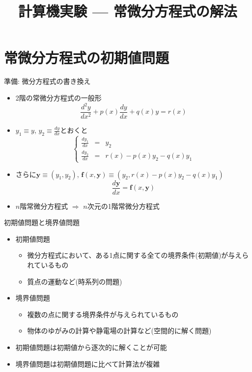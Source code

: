 \documentclass[dvipdfmx]{beamer}
\title{計算機実験 --- 常微分方程式の解法}
\begin{document}

\begin{frame}
  \titlepage
  \tableofcontents
\end{frame}

\section{常微分方程式の初期値問題}

\begin{frame}[t,fragile]{準備: 微分方程式の書き換え}
  \begin{itemize}
  \item 2階の常微分方程式の一般形
    \[
    \frac{d^2y}{dx^2} + p(x)\frac{dy}{dx} + q(x)y = r(x)
    \]
  \item $y_1 \equiv y$, $y_2 \equiv \frac{dy}{dx}$とおくと
    \[
    \left\{
    \begin{array}{ccl}
      \frac{dy_1}{dx} & = & y_2 \\
      \frac{dy_2}{dx} & = & r(x) - p(x) y_2 - q(x) y_1
    \end{array}
    \right.
    \]
  \item さらに$\bm{y}\equiv(y_1, y_2)$, $\bm{f}(x, \bm{y})\equiv \left(y_2, r(x)-p(x)y_2 - q(x)y_1\right)$
    \[
    \frac{d\bm{y}}{dx} = \bm{f}(x, \bm{y})
    \]
  \item $n$階常微分方程式 $\Rightarrow$ $n$次元の1階常微分方程式
  \end{itemize}
\end{frame}

\begin{frame}[t,fragile]{初期値問題と境界値問題}
  \begin{itemize}
    \setlength{\itemsep}{1em}
  \item 初期値問題
    \begin{itemize}
    \item 微分方程式において、ある1点に関する全ての境界条件(初期値)が与えられているもの
    \item 質点の運動など(時系列の問題)
  \end{itemize}
  \item 境界値問題
    \begin{itemize}
    \item 複数の点に関する境界条件が与えられているもの
    \item 物体のゆがみの計算や静電場の計算など(空間的に解く問題)
  \end{itemize}
  \item 初期値問題は初期値から逐次的に解くことが可能
  \item 境界値問題は初期値問題に比べて計算法が複雑
  \end{itemize}
\end{frame}
\end{document}
